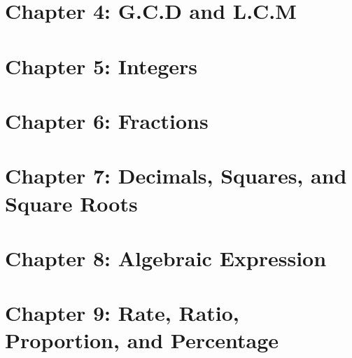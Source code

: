 \documentclass[
  letterpaper,
  DIV=11,
  numbers=noendperiod]{scrreprt}
\begin{document}

\hypertarget{chapter-4-g.c.d-and-l.c.m-1}{%
\section*{Chapter 4: G.C.D and
L.C.M}\label{chapter-4-g.c.d-and-l.c.m-1}}


\hypertarget{chapter-5-integers-1}{%
\section*{Chapter 5: Integers}\label{chapter-5-integers-1}}


\hypertarget{chapter-6-fractions-1}{%
\section*{Chapter 6: Fractions}\label{chapter-6-fractions-1}}


\hypertarget{chapter-7-decimals-squares-and-square-roots}{%
\section*{Chapter 7: Decimals, Squares, and Square
Roots}\label{chapter-7-decimals-squares-and-square-roots}}


\hypertarget{chapter-8-algebraic-expression}{%
\section*{Chapter 8: Algebraic
Expression}\label{chapter-8-algebraic-expression}}


\hypertarget{chapter-9-rate-ratio-proportion-and-percentage}{%
\section*{Chapter 9: Rate, Ratio, Proportion, and
Percentage}\label{chapter-9-rate-ratio-proportion-and-percentage}}
\end{document}
